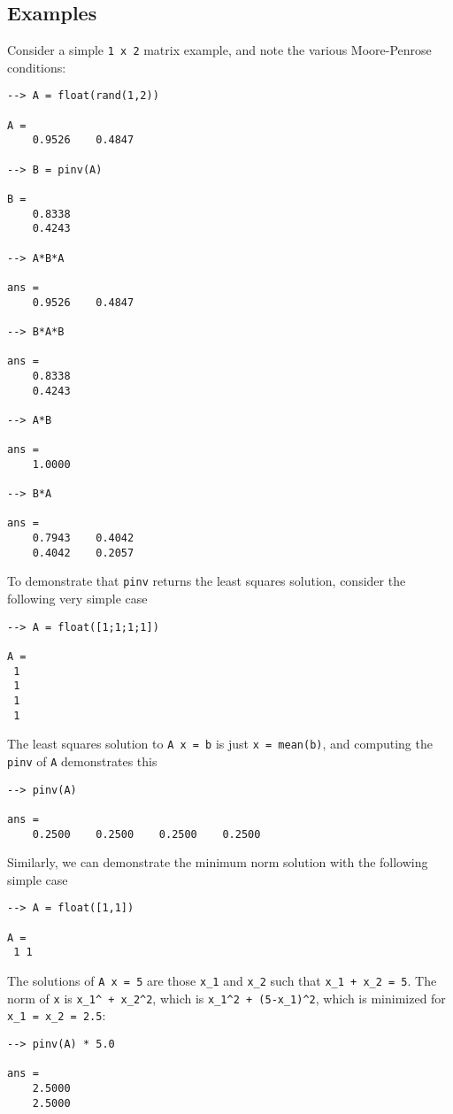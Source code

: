 \subsection{Examples}

Consider a simple \verb|1 x 2| matrix example, and note the various
Moore-Penrose conditions:
\begin{verbatim}
--> A = float(rand(1,2))

A = 
    0.9526    0.4847 

--> B = pinv(A)

B = 
    0.8338 
    0.4243 

--> A*B*A

ans = 
    0.9526    0.4847 

--> B*A*B

ans = 
    0.8338 
    0.4243 

--> A*B

ans = 
    1.0000 

--> B*A

ans = 
    0.7943    0.4042 
    0.4042    0.2057 
\end{verbatim}
To demonstrate that \verb|pinv| returns the least squares solution,
consider the following very simple case
\begin{verbatim}
--> A = float([1;1;1;1])

A = 
 1 
 1 
 1 
 1 
\end{verbatim}
The least squares solution to \verb|A x = b| is just \verb|x = mean(b)|,
and computing the \verb|pinv| of \verb|A| demonstrates this
\begin{verbatim}
--> pinv(A)

ans = 
    0.2500    0.2500    0.2500    0.2500 
\end{verbatim}
Similarly, we can demonstrate the minimum norm solution with
the following simple case
\begin{verbatim}
--> A = float([1,1])

A = 
 1 1 
\end{verbatim}
The solutions of \verb|A x = 5| are those \verb|x_1| and \verb|x_2| such that
\verb|x_1 + x_2 = 5|.  The norm of \verb|x| is \verb|x_1^ + x_2^2|, which is
\verb|x_1^2 + (5-x_1)^2|, which is minimized for \verb|x_1 = x_2 = 2.5|:
\begin{verbatim}
--> pinv(A) * 5.0

ans = 
    2.5000 
    2.5000 
\end{verbatim}
